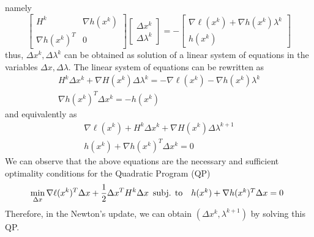 \documentclass{book}
\theoremstyle{definition}
\theoremstyle{remark}
\theoremstyle{remark}
\begin{document}
namely 
\[
    \begin{bmatrix}
        H^k & \nabla h(x^k) \\
        \nabla h(x^k)^T & 0
        \end{bmatrix}  \begin{bmatrix}
        \Delta x^k \\ \Delta \lambda^k
        \end{bmatrix} = -\begin{bmatrix}
        \nabla \ell(x^k)+\nabla h(x^k)\lambda^k \\ h(x^k)
    \end{bmatrix}
\]
thus, $\Delta x^k, \Delta\lambda^k$ can be obtained as solution of a linear system of equations in the variables $\Delta x, \Delta\lambda$.
The linear system of equations can be rewritten as 
\begin{gather*}
    H^k\Delta x^k+\nabla H(x^k)\Delta \lambda^k = -\nabla\ell(x^k) - \nabla h(x^k)\lambda^k \\
    \nabla h(x^k)^T \Delta x^k = -h(x^k)
\end{gather*}
and equivalently as 
\begin{gather*}
    \nabla\ell(x^k) +H^k\Delta x^k+\nabla H(x^k)\Delta \lambda^{k+1} \\
    h(x^k)+\nabla h(x^k)^T\Delta x^k = 0
\end{gather*}
We can observe that the above equations are the necessary and sufficient optimality conditions for the Quadratic Program (QP)
\[
    \min_{\Delta x} \nabla\ell(x^k)^T\Delta x + \displaystyle\frac{1}{2}\Delta x^TH^k\Delta x \\
    \begin{array}{r l}
        \text{subj. to} & h(x^k) + \nabla h(x^k)^T \Delta x = 0
    \end{array}
\]
Therefore, in the Newton's update, we can obtain $(\Delta x^k, \lambda^{k+1})$ by solving this QP.
\end{document}

